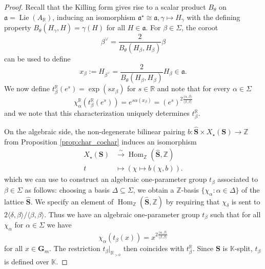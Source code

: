 \documentclass[12pt]{amsart}
\newcommand{\R}{\mathbb{R} }
\newcommand{\Z}{\mathbb{Z} }
\newcommand{\K}{\mathbb{K}}
\newcommand{\fraka}{\mathfrak{a}}
\newcommand{\bG}{\mathbf{G}}
\newcommand{\bS}{\mathbf{S}}
\numberwithin{equation}{section}
\theoremstyle{remark} %
\begin{document}
\begin{proof}
	Recall that the Killing form gives rise to a scalar product $B_\theta$ on $\fraka = \operatorname{Lie}(A_\R)$, inducing an isomorphism $\fraka^\star \cong \fraka, \gamma \mapsto H_\gamma$ with the defining property $B_\theta(H_\gamma,H) = \gamma(H)$ for all $H \in \fraka$. For $\beta \in \Sigma$, the coroot
	$$
	\beta^\vee = \frac{2}{B_{\theta}(H_\beta,H_\beta)}\beta
	$$
	can be used to define
	$$
	x_\beta := H_{\beta^\vee} = \frac{2}{B_{\theta}(H_\beta,H_\beta)}H_\beta \in \fraka.
	$$
	We now define $t_\beta^\R(e^s) = \exp(sx_\beta)$ for $s \in \R$ and note that for every $\alpha \in \Sigma$
	$$
	\chi_\alpha^\R(t_\beta^\R(e^s)) =  e^{s\alpha(x_\beta)} = (e^s)^{2\frac{\langle \alpha,\beta \rangle}{\langle \beta,\beta \rangle }}
	$$
	and we note that this characterization uniquely determines $t_\beta^\R$.
	
	On the algebraic side, the non-degenerate bilinear pairing $b\colon \hat{\bS} \times X_{\star}(\bS) \to \Z $ from Proposition \ref{prop:char_cochar} induces an isomorphism
	\begin{align*}
			X_{\star}(\bS) &\stackrel{\sim}{\to} \operatorname{Hom}_{\mathbb{Z}}(\hat{\bS}, \mathbb{Z}) \\
		t &\mapsto (\chi \mapsto b(\chi,b)) .	
	\end{align*}
    which we can use to construct an algebraic one-parameter group $t_\beta$ associated to $\beta\in \Sigma$ as follows: choosing a basis $\Delta \subseteq \Sigma$, we obtain a $\mathbb{Z}$-basis $\{ \chi_\alpha \colon \alpha \in \Delta\}$ of the lattice $\hat{\bS}$. We specify an element of $\operatorname{Hom}_{\mathbb{Z}}(\hat{\bS}, \mathbb{Z})$ by requiring that $\chi_\delta$ is sent to $2 \langle \delta,\beta \rangle / \langle \beta, \beta\rangle$. Thus we have an algebraic one-parameter group $t_\beta$ such that for all $\chi_\alpha$ for $\alpha \in \Sigma$ we have
    $$
    \chi_\alpha\left(t_\beta\left( x \right)\right) = x^{2\frac{\langle \alpha,\beta \rangle}{\langle \beta,\beta \rangle }}
    $$ 
    for all $x \in \bG_m$. The restriction $t_\beta|_{\R _{>0}}$ then coincides with $t_\beta^{\R}$. Since $\bS$ is $\K$-split, $t_\beta$ is defined over $\K$. 
\end{proof}
\end{document}

